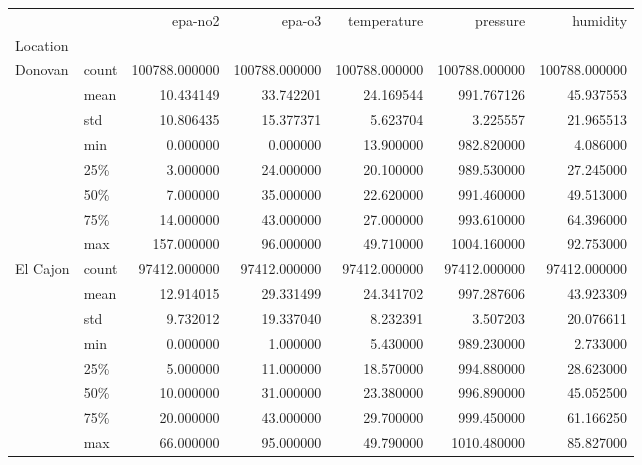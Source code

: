 \begin{tabular}{llrrrrr}
\toprule
        &       &        epa-no2 &         epa-o3 &    temperature &       pressure &       humidity \\
Location & {} &                &                &                &                &                \\
\midrule
Donovan & count &  100788.000000 &  100788.000000 &  100788.000000 &  100788.000000 &  100788.000000 \\
        & mean &      10.434149 &      33.742201 &      24.169544 &     991.767126 &      45.937553 \\
        & std &      10.806435 &      15.377371 &       5.623704 &       3.225557 &      21.965513 \\
        & min &       0.000000 &       0.000000 &      13.900000 &     982.820000 &       4.086000 \\
        & 25\% &       3.000000 &      24.000000 &      20.100000 &     989.530000 &      27.245000 \\
        & 50\% &       7.000000 &      35.000000 &      22.620000 &     991.460000 &      49.513000 \\
        & 75\% &      14.000000 &      43.000000 &      27.000000 &     993.610000 &      64.396000 \\
        & max &     157.000000 &      96.000000 &      49.710000 &    1004.160000 &      92.753000 \\
El Cajon & count &   97412.000000 &   97412.000000 &   97412.000000 &   97412.000000 &   97412.000000 \\
        & mean &      12.914015 &      29.331499 &      24.341702 &     997.287606 &      43.923309 \\
        & std &       9.732012 &      19.337040 &       8.232391 &       3.507203 &      20.076611 \\
        & min &       0.000000 &       1.000000 &       5.430000 &     989.230000 &       2.733000 \\
        & 25\% &       5.000000 &      11.000000 &      18.570000 &     994.880000 &      28.623000 \\
        & 50\% &      10.000000 &      31.000000 &      23.380000 &     996.890000 &      45.052500 \\
        & 75\% &      20.000000 &      43.000000 &      29.700000 &     999.450000 &      61.166250 \\
        & max &      66.000000 &      95.000000 &      49.790000 &    1010.480000 &      85.827000 \\

\end{tabular}
